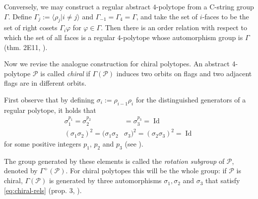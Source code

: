 \documentclass{article}
\theoremstyle{definition}
\newcommand{\p}{\mathcal{P}}
\DeclareMathOperator{\Id}{Id}
\begin{document}
	Conversely, we may construct a regular abstract $4$-polytope from a C-string group $\Gamma$. Define $\Gamma_j:=\langle\rho_j|i\neq j\rangle$ and $\Gamma_{-1}=\Gamma_4=\Gamma$, and take the set of $i$-faces to be the set of right cosets $\Gamma_i\varphi$ for $\varphi\in\Gamma$. Then there is an order relation with respect to which the set of all faces is a regular $4$-polytope whose automorphism group is $\Gamma$ (thm. 2E11, \cite{abstract-polytopes}).
	
	\vspace{.5cm}
	
	Now we revise the analogue construction for chiral polytopes. An abstract 4-polytope $\p$ is called \textit{chiral} if $\Gamma(\p)$ induces two orbits on flags and two adjacent flags are in different orbits.
	
	First observe that by defining $\sigma_i:=\rho_{i-1}\rho_i$ for the distinguished generators of a regular polytope, it holds that
	\begin{equation}\label{eq:chiral-rels}
		\begin{aligned}
			\sigma_1^{p_1}=\sigma_2^{p_2}&=\sigma_3^{p_3}=\Id\\
			(\sigma_1\sigma_2)^2=(\sigma_1\sigma_2&\sigma_3)^2=(\sigma_2\sigma_3)^2=\Id
		\end{aligned}
	\end{equation}
	for some positive integers $p_1$, $p_2$ and $p_3$ (see \cite{schulte-chiral}).
	
	The group generated by these elements is called the \textit{rotation subgroup} of $\p$, denoted by $\Gamma^+(\p)$. For chiral polytopes this will be the whole group: if $\p$ is chiral, $\Gamma(\p)$ is generated by three automorphisms $\sigma_1,\sigma_2$ and $\sigma_3$ that satisfy \cref{eq:chiral-rels} (prop. 3, \cite{schulte-chiral}).
	
\end{document}
